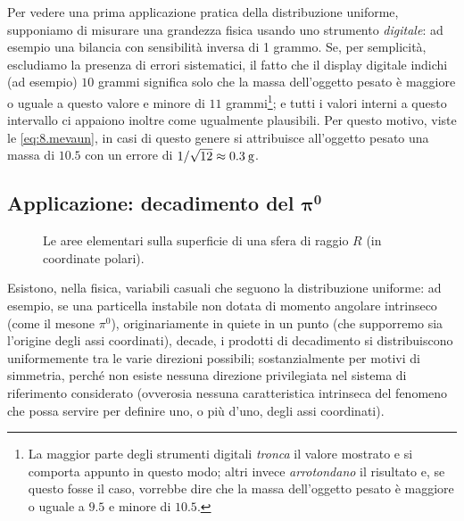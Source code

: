 Per vedere una prima applicazione pratica della
distribuzione uniforme, supponiamo di misurare una grandezza
fisica  usando uno strumento \emph{digitale}: ad esempio una
bilancia con sensibilit\`a inversa di  1 grammo.  Se, per
semplicit\`a, escludiamo la presenza di errori sistematici,
il fatto che il display digitale indichi (ad esempio) $10$
grammi significa solo che la massa dell'oggetto pesato \`e
maggiore o uguale a questo valore e minore di $11$
grammi\/\footnote{La maggior parte degli strumenti digitali
  \emph{tronca} il valore mostrato e si comporta appunto in
  questo modo; altri invece \emph{arrotondano} il risultato
  e, se questo fosse il caso, vorrebbe dire che la massa
  dell'oggetto pesato \`e maggiore o uguale a $9.5$ e
  minore di $10.5$.}; e tutti i valori interni a
questo intervallo ci appaiono inoltre come ugualmente
plausibili.  Per questo motivo, viste le
\eqref{eq:8.mevaun}, in casi di questo genere si attribuisce
all'oggetto pesato una massa di $10.5$ con un errore
di $1 / \sqrt{12} \approx 0.3 \un{g}$.

\subsection[Applicazione: decadimento del
    $\pi^0$]{Applicazione: decadimento del
    $\boldsymbol{\pi}^{\boldsymbol{0}}$}
\begin{figure}[htbp]
  \vspace*{2ex}
  \begin{center} {
    
  } \end{center}
  \caption[Le aree elementari sulla superficie di una
    sfera di raggio $R$]{Le aree elementari sulla superficie
    di una sfera di raggio $R$ (in coordinate polari).}
  \label{fig:8.sfera}
\end{figure}

Esistono, nella fisica, variabili casuali che seguono la
distribuzione uniforme: ad esempio, se una particella
instabile non dotata di momento angolare intrinseco (come il
mesone $\pi^0$), originariamente in quiete in un punto (che
supporremo sia l'origine degli assi coordinati), decade, i
prodotti di decadimento si distribuiscono uniformemente tra
le varie direzioni possibili; sostanzialmente per motivi di
simmetria, perch\'e non esiste nessuna direzione
privilegiata nel sistema di riferimento considerato
(ovverosia nessuna caratteristica intrinseca del fenomeno
che possa servire per definire uno, o pi\`u d'uno, degli
assi coordinati).

